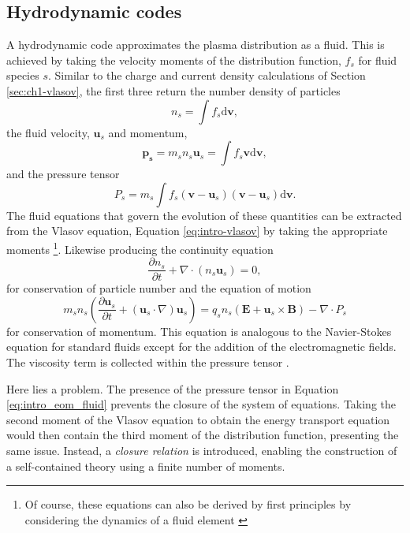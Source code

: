 \subsection{Hydrodynamic codes}
A hydrodynamic code approximates the plasma distribution as a fluid. This is achieved by taking the velocity moments of the distribution function, $f_s$ for fluid species $s$. Similar to the charge and current density calculations of Section \ref{sec:ch1-vlasov}, the first three return the number density of particles
\begin{equation}
	n_s = \int f_s \mathrm{d}\mathbf{v},
\end{equation}
the fluid velocity, $\mathbf{u}_s$ and momentum,
\begin{equation}
	\mathbf{p_s} = m_sn_s\mathbf{u}_s = \int f_s \mathbf{v}\mathrm{d}\mathbf{v},
\end{equation}
and the pressure tensor
\begin{equation}
	P_s = m_s\int f_s (\mathbf{v}-\mathbf{u}_s)(\mathbf{v}-\mathbf{u}_s)\mathrm{d}\mathbf{v}.
\end{equation}
The fluid equations that govern the evolution of these quantities can be extracted from the Vlasov equation, Equation \ref{eq:intro-vlasov} by taking the appropriate moments \footnote{Of course, these equations can also be derived by first principles by considering the dynamics of a fluid element \cite{chenIntroductionPlasmaPhysics2016}}. Likewise  producing the continuity equation
\begin{equation}
	\frac{\partial n_s}{\partial t} + \nabla \cdot (n_s \mathbf{u}_s) = 0,
\end{equation}
for conservation of particle number and the equation of motion
\begin{equation}\label{eq:intro_eom_fluid}
	m_sn_s\left(\frac{\partial \mathbf{u}_s}{\partial t} + (\mathbf{u}_s\cdot \nabla) \mathbf{u}_s \right) = q_sn_s(\mathbf{E}+\mathbf{u}_s \times \mathbf{B}) - \nabla \cdot P_s
\end{equation}
for conservation of momentum. This equation is analogous to the Navier-Stokes equation for standard fluids except for the addition of the electromagnetic fields. The viscosity term is collected within the pressure tensor \cite{chenIntroductionPlasmaPhysics2016}.

Here lies a problem. The presence of the pressure tensor in Equation \ref{eq:intro_eom_fluid} prevents the closure of the system of equations. Taking the second moment of the Vlasov equation to obtain the energy transport equation would then contain the third moment of the distribution function, presenting the same issue. Instead, a \textit{closure relation} is introduced, enabling the construction of a self-contained theory using a finite number of moments.

